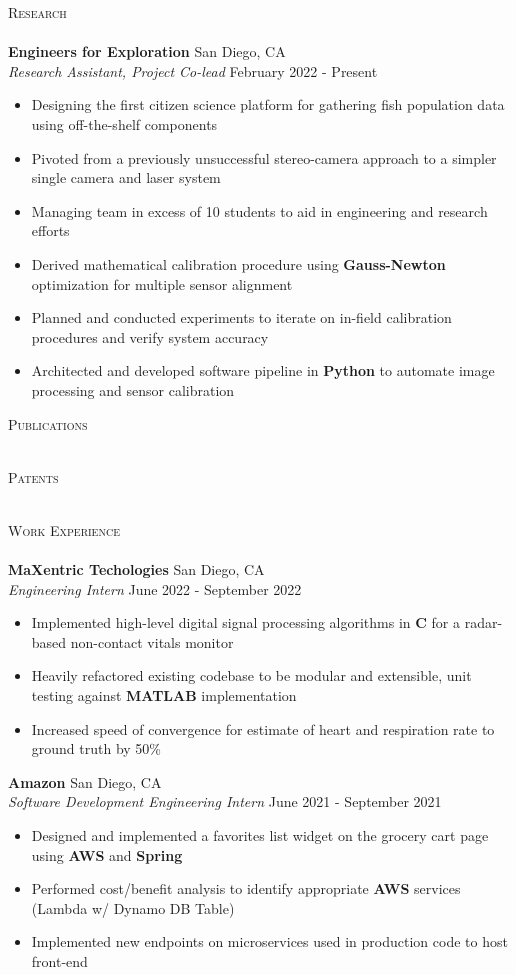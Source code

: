 \documentclass[a4paper]{article}
\newcommand{\lineunder} {
    \vspace*{-8pt} \\
    \hspace*{-18pt} \hrulefill \\
}
\newcommand{\header} [1] {
    {\hspace*{-18pt}\vspace*{6pt} \textsc{#1}}
    \vspace*{-6pt} \lineunder
}
\newenvironment{entry}[4][]{
  \textbf{#2} \hfill #1 \\
  \textit{#3} \hfill #4 \\
  \vspace{-2mm}
  \begin{itemize} \itemsep 0em
  }
  {
  \end{itemize}
}
\begin{document}
\header{Research}
\vspace{1mm}
\begin{entry}[San Diego, CA]{Engineers for Exploration}{Research
    Assistant, Project Co-lead}{February 2022 - Present}
	\item Designing the first citizen science platform for gathering fish population data
    using off-the-shelf components
    \item Pivoted from a previously unsuccessful stereo-camera approach to a simpler single camera and laser system
    \item Managing team in excess of 10 students to aid in engineering and research efforts
  \item Derived mathematical calibration procedure using \textbf{Gauss-Newton} optimization
    for multiple sensor alignment
  \item Planned and conducted experiments to iterate on in-field calibration procedures and verify system accuracy
	\item Architected and developed software pipeline in \textbf{Python} to automate image
    processing and sensor calibration
\end{entry}

\header{Publications}
\nocite{thesis,paper}



\header{Patents}

\header{Work Experience}
\vspace{1mm}
\begin{entry}[San Diego, CA]{MaXentric Techologies}{Engineering Intern}{June
    2022 - September 2022}
	\item Implemented high-level digital signal processing algorithms in \textbf{C} for a radar-based non-contact vitals monitor
	\item Heavily refactored existing codebase to be modular and
    extensible, unit testing against \textbf{MATLAB} implementation
  \item Increased speed of convergence for estimate of heart and respiration
    rate to ground truth by 50\%
\end{entry}

  \begin{entry}[San Diego, CA]{Amazon}{Software Development Engineering
      Intern}{June 2021 - September 2021}
  \item Designed and implemented a favorites list widget on the grocery cart page using \textbf{AWS} and \textbf{Spring}
	\item Performed cost/benefit analysis to identify appropriate \textbf{AWS} services (Lambda w/ Dynamo DB Table)
	\item Implemented new endpoints on microservices used in production code to host front-end
\end{entry}
\end{document}
